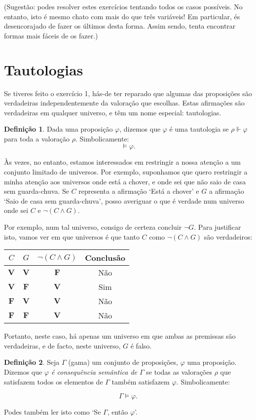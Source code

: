 \documentclass{article}
\theoremstyle{definition}
\newtheorem{definicao}{Definição}
\theoremstyle{remark}
\newcommand{\V}{\mathbf{V}}
\newcommand{\F}{\mathbf{F}}
\begin{document}
	(Sugestão: podes resolver estes exercícios tentando todos os casos possíveis. No entanto, isto é mesmo chato com mais do que três variáveis! Em particular, és desencorajado de fazer os últimos desta forma. Assim sendo, tenta encontrar formas mais fáceis de os fazer.)
	
	\section{Tautologias}
	
	Se tiveres feito o exercício 1, hás-de ter reparado que algumas das proposições são verdadeiras independentemente da valoração que escolhas. Estas afirmações são verdadeiras em qualquer universo, e têm um nome especial: tautologias.
	
	\begin{definicao}
	Dada uma proposição $\varphi$, dizemos que $\varphi$ é uma tautologia se $\rho \Vdash \varphi$ para toda a valoração $\rho$. Simbolicamente:
	\[\vDash \varphi.\]
	\end{definicao}
	
	Às vezes, no entanto, estamos interessados em restringir a nossa atenção a um conjunto limitado de universos. Por exemplo, suponhamos que quero restringir a minha atenção aos universos onde está a chover, e onde sei que não saio de casa sem guarda-chuva. Se $C$ representa a afirmação `Está a chover' e $G$ a afirmação `Saio de casa sem guarda-chuva', posso averiguar o que é verdade num universo onde sei $C$ e $\neg (C \land G)$.
	
	Por exemplo, num tal universo, consigo de certeza concluir $\neg G$. Para justificar isto, vamos ver em que universos é que tanto $C$ como $\neg (C \land G)$ são verdadeiros:
	
	\begin{tabular}{|c|c|c|c|}
	\hline
	$C$ & $G$ & $\neg(C \land G)$ & Conclusão \\
	\hline
	$\V$ & $\V$ & $\F$ & Não \\
	$\V$ & $\F$ & $\V$ & Sim \\
	$\F$ & $\V$ & $\V$ & Não \\
	$\F$ & $\F$ & $\V$ & Não \\
	\hline
	\end{tabular}
	\smallskip
	
	Portanto, neste caso, há apenas um universo em que ambas as premissas são verdadeiras, e de facto, neste universo, $G$ é falso.
	
	\begin{definicao}
	Seja $\Gamma$ (gama) um conjunto de proposições, $\varphi$ uma proposição. Dizemos que \emph{$\varphi$ é consequência semântica de $\Gamma$} se todas as valorações $\rho$ que satisfazem todos os elementos de $\Gamma$ também satisfazem $\varphi$. Simbolicamente:
	
	\[\Gamma \vDash \varphi.\]
	
	Podes também ler isto como `Se $\Gamma$, então $\varphi$'.
	\end{definicao}
	
\end{document}
